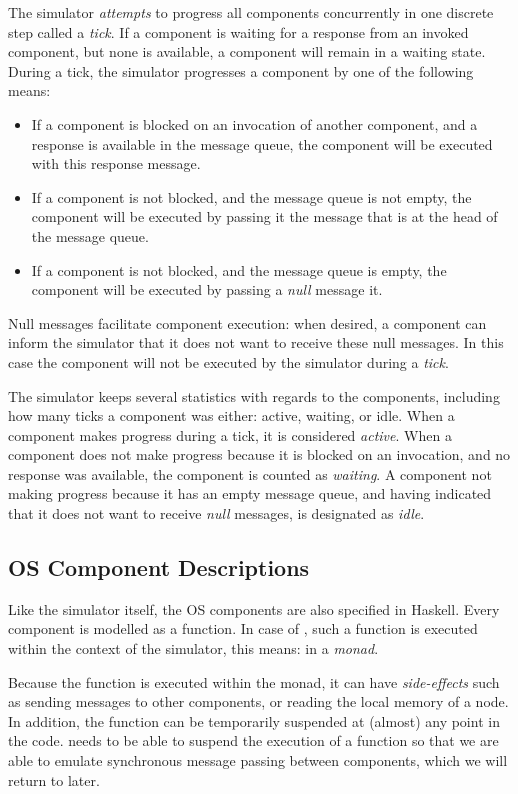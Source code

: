 The simulator \emph{attempts} to progress all components concurrently in one discrete step called a \emph{tick}.
If a component is waiting for a response from an invoked component, but none is available, a component will remain in a waiting state.
During a tick, the simulator progresses a component by one of the following means:
\begin{itemize}
  \item If a component is blocked on an invocation of another component, and a response is available in the message queue, the component will be executed with this response message.
  \item If a component is not blocked, and the message queue is not empty, the component will be executed by passing it the message that is at the head of the message queue.
  \item If a component is not blocked, and the message queue is empty, the component will be executed by passing a \emph{null} message it.
\end{itemize}
Null messages facilitate component execution:
when desired, a component can inform the simulator that it does not want to receive these null messages.
In this case the component will not be executed by the simulator during a \emph{tick}.

The simulator keeps several statistics with regards to the components, including how many ticks a component was either: active, waiting, or idle.
When a component makes progress during a tick, it is considered \emph{active}.
When a component does not make progress because it is blocked on an invocation, and no response was available, the component is counted as \emph{waiting}.
A component not making progress because it has an empty message queue, and having indicated that it does not want to receive \emph{null} messages, is designated as \emph{idle}.

\subsection{OS Component Descriptions}
Like the simulator itself, the OS components are also specified in Haskell. Every component is modelled as a function.
In case of \soosim, such a function is executed within the context of the simulator, this means: in a \emph{monad}.

Because the function is executed within the monad, it can have \emph{side-effects} such as sending messages to other components, or reading the local memory of a node.
In addition, the function can be temporarily suspended at (almost) any point in the code.
\soosim needs to be able to suspend the execution of a function so that we are able to emulate synchronous message passing between components, which we will return to later.


